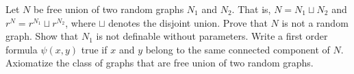 
\begin{exercise}\label{unionedisgiunta}
Let $N$ be free union of two random graphs $N_1$ and $N_2$.
That is, $N=N_1\sqcup N_2$ and $r^N= r^{N_1}\sqcup r^{N_2}$, where  $\sqcup$ denotes the disjoint union.
Prove that $N$ is not a random graph.
Show that $N_1$ is not definable without parameters.
Write a first order formula $\psi(x,y)$ true if $x$ and $y$ belong to the same connected component of $N$.
Axiomatize the class of graphs that are free union of two random graphs.
\end{exercise}

%
%
%

